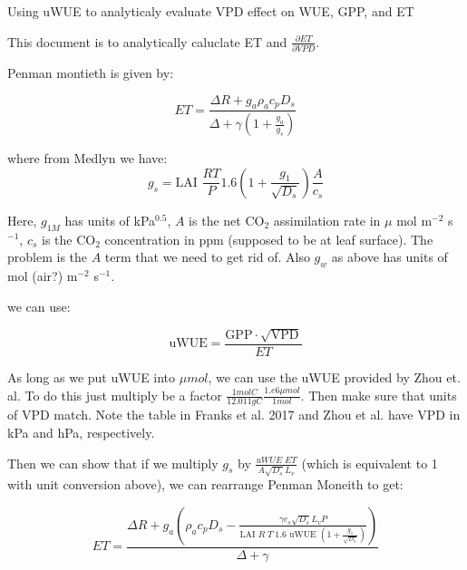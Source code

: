 
\usepackage{graphics, graphicx}
\graphicspath{ {./} } %


\begin{center}
\large{Using uWUE to analyticaly evaluate VPD effect on WUE, GPP, and ET}\end{center}

\bigskip

This document is to analytically caluclate ET and $\frac{\partial ET} {\partial VPD}$.

Penman montieth is given by:

\begin{equation}
  ET = \frac{\Delta R + g_a \rho_a c_p D_{s}}{\Delta + \gamma(1 + \frac{g_a}{g_s})}
\end{equation}

where from Medlyn we have:
\begin{equation}
  g_s = \text{LAI } \frac{R T}{P} 1.6 \left(1 + \frac{g_1}{\sqrt{D_{s}}}\right) \frac{A}{c_s}
\end{equation}

Here, $g_{1M}$ has units of kPa$^{0.5}$, $A$ is the net CO$_2$ assimilation rate in $\mu$ mol m$^{-2}$ s$^{-1}$, $c_s$ is the CO$_2$ concentration in ppm (supposed to be at leaf surface). The problem is the $A$ term that we need to get rid of. Also $g_w$ as above has units of mol (air?) m$^{-2}$ s$^{-1}$. 

we can use:

\begin{equation}
  \text{uWUE} = \frac{\text{GPP} \cdot \sqrt{\text{VPD}}}{ET}
\end{equation}

As long as we put uWUE into $\mu mol$, we can use the uWUE provided by Zhou et. al. To do this just multiply be a factor $ \frac{1 mol C}{12.011 g C} \frac{1.e6 \mu mol}{1 mol}$. Then make sure that units of VPD match. Note the table in Franks et al. 2017 and Zhou et al. have VPD in kPa and hPa, respectively.

Then we can show that if we multiply $g_s$ by $\frac{ uWUE \; ET}{A \sqrt{D_s} L_v}$ (which is equivalent to 1 with unit conversion above), we can rearrange Penman Moneith to get:

\begin{equation}
  ET = \frac{\Delta R + g_a \left( \rho_a c_p D_{s} - \frac{\gamma c_s \sqrt{D_s} L_v P }{\text{LAI } R \; T \; 1.6 \text{ uWUE } (1 + \frac{g_1}{\sqrt{D_s}})} \right) }{ \Delta + \gamma}
\end{equation}

